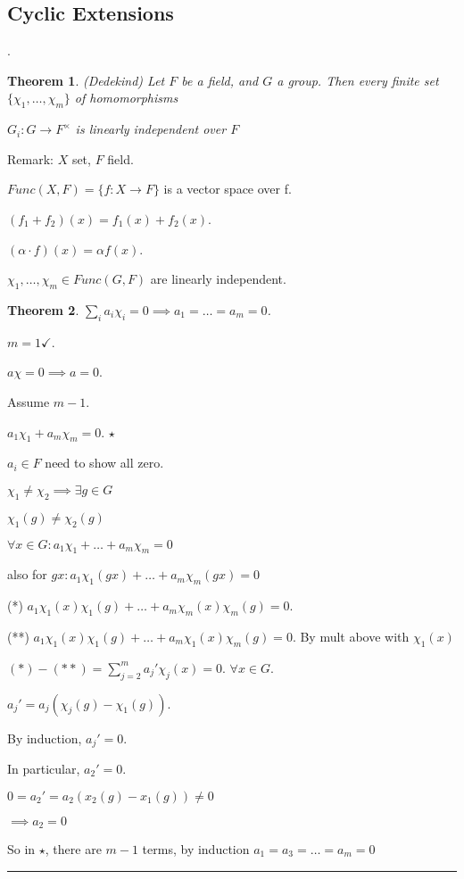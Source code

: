 \documentclass[twoside]{article}
\newcounter{lecnum}
\renewcommand{\a}{\alpha}
\newtheorem{theorem}{Theorem}[lecnum]
\newenvironment{proof}{{\bf Proof:}}{\hfill\rule{2mm}{2mm}}
\begin{document}
\subsection{Cyclic Extensions}. 

\begin{theorem}
    (Dedekind) Let $F$ be a field, and $G$ a group. Then every finite set $\{\chi_1, \dots, \chi_m\}$ of homomorphisms 

    $G_i : G \rightarrow F^{\times}$ is linearly independent over $F$
\end{theorem}

Remark: $X$ set, $F$ field. 

$Func (X,F) = \{f : X \rightarrow F\}$ is a vector space over f. 

$(f_1 + f_2)(x) = f_1(x) + f_2(x)$. 

$(\alpha \cdot f)(x) = \a f(x)$.

$\chi_1, \dots, \chi_m \in Func(G,F)$ are linearly independent.


\begin{theorem}
    $\sum_ia_i\chi_i = 0 \implies a_1 = \dots = a_m = 0$.
\end{theorem}

\begin{proof}
    $m = 1 \checkmark$.

    $a \chi = 0 \implies a = 0$. 

    Assume $m -1$. 

    $a_1 \chi_1 + a_m \chi_m = 0$. $\star$

    $a_i \in F$ need to show all zero.

    $\chi_1 \neq \chi_2 \implies \exists g \in G$

    $\chi_1(g) \neq \chi_2(g)$

    $\forall x \in G: a_1\chi_1 + \dots + a_m\chi_m = 0$

    also for $gx: a_1\chi_1(gx) + \dots + a_m\chi_m(gx) = 0$

    (*) $a_1\chi_1(x)\chi_1(g) + \dots + a_m\chi_m(x)\chi_m(g) = 0$.

    (**) $a_1\chi_1(x)\chi_1(g) + \dots + a_m\chi_1(x)\chi_m(g) = 0$. By mult above with $\chi_1(x)$

    $(*) - (**) = \sum_{j=2}^m a_j'\chi_j(x) = 0$. $\forall x \in G$. 


    $a_j' = a_j(\chi_j(g) - \chi_1(g))$. 

    By induction, $a_j' = 0$. 

    In particular, $a_2' = 0$.

    $0 = a_2' = a_2 (x_2(g) - x_1(g)) \neq 0$

    $\implies a_2 = 0$

    So in $\star$, there are $m-1$ terms, by induction $a_1 = a_3 = \dots = a_m = 0$

\end{proof}
\end{document}
